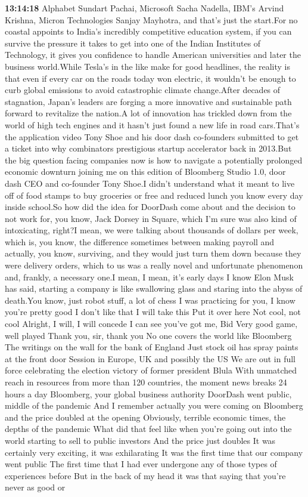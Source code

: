 \documentclass{article}%
\begin{document}
\textbf{13:14:18}%
\newline%
Alphabet Sundart Pachai, Microsoft Sacha Nadella, IBM's Arvind Krishna, Micron Technologies Sanjay Mayhotra, and that's just the start.For no coastal appoints to India's incredibly competitive education system, if you can survive the pressure it takes to get into one of the Indian Institutes of Technology, it gives you confidence to handle American universities and later the business world.While Tesla's in the like make for good headlines, the reality is that even if every car on the roads today won electric, it wouldn't be enough to curb global emissions to avoid catastrophic climate change.After decades of stagnation, Japan's leaders are forging a more innovative and sustainable path forward to revitalize the nation.A lot of innovation has trickled down from the world of high tech engines and it hasn't just found a new life in road cars.That's the application video Tony Shoe and his door dash co{-}founders submitted to get a ticket into why combinators prestigious startup accelerator back in 2013.But the big question facing companies now is how to navigate a potentially prolonged economic downturn joining me on this edition of Bloomberg Studio 1.0, door dash CEO and co{-}founder Tony Shoe.I didn't understand what it meant to live off of food stamps to buy groceries or free and reduced lunch you know every day inside school.So how did the idea for DoorDash come about and the decision to not work for, you know, Jack Dorsey in Square, which I'm sure was also kind of intoxicating, right?I mean, we were talking about thousands of dollars per week, which is, you know, the difference sometimes between making payroll and actually, you know, surviving, and they would just turn them down because they were delivery orders, which to us was a really novel and unfortunate phenomenon and, frankly, a necessary one.I mean, I mean, it's early days I know Elon Musk has said, starting a company is like swallowing glass and staring into the abyss of death.You know, just robot stuff, a lot of chess I was practicing for you, I know you're pretty good I don't like that I will take this Put it over here Not cool, not cool Alright, I will, I will concede I can see you've got me, Bid Very good game, well played Thank you, sir, thank you No one covers the world like Bloomberg The writings on the wall for the bank of England Just stock oil has spray paints at the front door Session in Europe, UK and possibly the US We are out in full force celebrating the election victory of former president Blula With unmatched reach in resources from more than 120 countries, the moment news breaks 24 hours a day Bloomberg, your global business authority DoorDash went public, middle of the pandemic And I remember actually you were coming on Bloomberg and the price doubled at the opening Obviously, terrible economic times, the depths of the pandemic What did that feel like when you're going out into the world starting to sell to public investors And the price just doubles It was certainly very exciting, it was exhilarating It was the first time that our company went public The first time that I had ever undergone any of those types of experiences before But in the back of my head it was that saying that you're never as good or 
\end{document}
